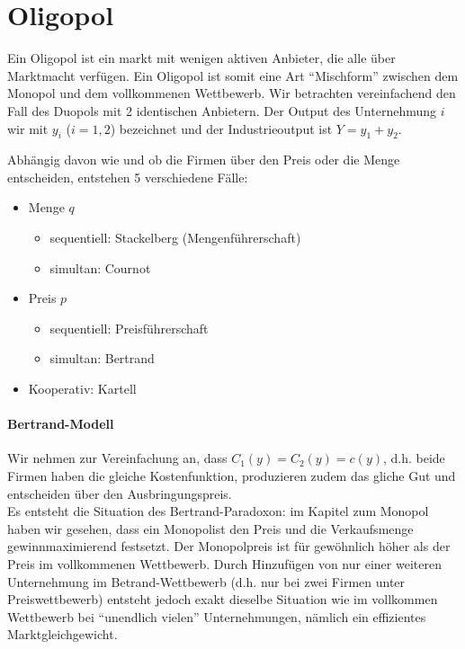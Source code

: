 \chapter{Oligopol}

Ein Oligopol ist ein markt mit wenigen aktiven Anbieter, die alle über Marktmacht verfügen. Ein Oligopol ist somit eine Art \enquote{Mischform} zwischen dem Monopol und dem vollkommenen Wettbewerb. Wir betrachten vereinfachend den Fall des Duopols mit 2 identischen Anbietern. Der Output des Unternehmung $i$ wir mit $y_i$ ($i=1,2$) bezeichnet und der Industrieoutput ist $Y = y_1 + y_2$. ~\smallskip

Abhängig davon wie und ob die Firmen über den Preis oder die Menge entscheiden, entstehen 5 verschiedene Fälle:
\begin{itemize}
	\item Menge $q$
		\begin{itemize}
			\item sequentiell: Stackelberg (Mengenführerschaft)
			\item simultan: Cournot
		\end{itemize}
	\item Preis $p$
		\begin{itemize}
			\item sequentiell: Preisführerschaft
			\item simultan: Bertrand
		\end{itemize}		
	\item Kooperativ: Kartell
\end{itemize}

\subsubsection*{Bertrand-Modell}

Wir nehmen zur Vereinfachung an, dass $C_1(y) = C_2(y) = c(y)$, d.h. beide Firmen haben die gleiche Kostenfunktion, produzieren zudem das gliche Gut und entscheiden über den Ausbringungspreis. ~\\

Es entsteht die Situation des Bertrand-Paradoxon: im Kapitel zum Monopol haben wir gesehen, dass ein Monopolist den Preis und die Verkaufsmenge gewinnmaximierend festsetzt. Der Monopolpreis ist für gewöhnlich höher als der Preis im vollkommenen Wettbewerb. Durch Hinzufügen von nur einer weiteren Unternehmung im Betrand-Wettbewerb (d.h. nur bei zwei Firmen unter Preiswettbewerb) entsteht jedoch exakt dieselbe Situation wie im vollkommen Wettbewerb bei \enquote{unendlich vielen} Unternehmungen, nämlich ein effizientes Marktgleichgewicht. ~\smallskip

